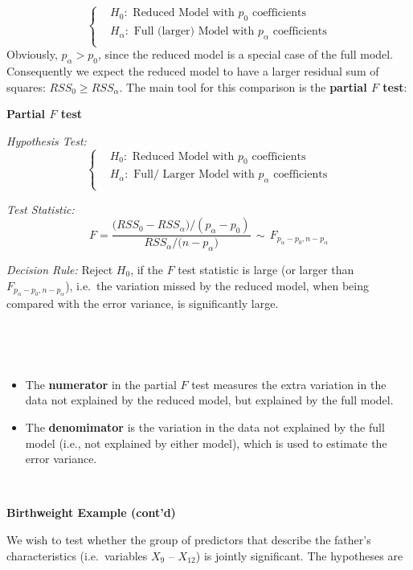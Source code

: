 \documentclass[
]{book}
\begin{document}
\[
\begin{cases}
& H_0: \text{ Reduced Model with } p_0 \text{ coefficients}\\
& H_{\alpha}: \text{ Full (larger) Model with } p_{\alpha} \text{ coefficients}\\
\end{cases}
\]
Obviously, \(p_{\alpha} > p_0\), since the reduced model is a special case of the full model. Consequently we expect the reduced model to have a larger residual sum of squares: \(RSS_0 \geq RSS_{\alpha}\). The main tool for this comparison is the \textbf{partial \(F\) test}:

\textbf{Partial \(F\) test}

\emph{Hypothesis Test:}
\[
\begin{cases}
& H_0: \text{ Reduced Model with } p_0 \text{ coefficients}\\
& H_{\alpha}: \text{ Full/ Larger Model with } p_{\alpha} \text{ coefficients}\\
\end{cases}
\]

\emph{Test Statistic:}
\[F=\frac{\bigl(RSS_0 - RSS_{\alpha}\bigr)/(p_{\alpha} - p_0)}{RSS_{\alpha}/ \bigl(n-p_{\alpha} \bigr)}\,  \sim \, F_{p_{\alpha} - p_0, n-p_{\alpha}}\]

\emph{Decision Rule:}
Reject \(H_0\), if the \(F\) test statistic is large (or larger than \(F_{p_{\alpha} - p_0, n-p_{\alpha}}\)), i.e.~the variation missed by the reduced model, when being compared with the error variance, is significantly large.

~

~

\begin{itemize}
\item
  The \textbf{numerator} in the partial \(F\) test measures the extra variation in the data not explained by the reduced model, but explained by the full model.
\item
  The \textbf{denomimator} is the variation in the data not explained by the full model (i.e., not explained by either model), which is used to estimate the error variance.
\end{itemize}

~

\textbf{Birthweight Example (cont'd)}

We wish to test whether the group of predictors that describe the father's characteristics (i.e.~variables \(X_9\) -- \(X_{12}\)) is jointly significant. The hypotheses are
\end{document}
